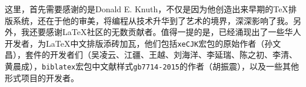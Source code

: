 \begin{WUTacknowledgements}
\par 这里，首先需要感谢的是Donald E. Knuth，不仅是因为他创造出来早期的{\TeX}排版系统，还在于他的审美，将编程从技术升华到了艺术的境界，深深影响了我。另外，我还要感谢{\LaTeX}社区的无数贡献者。值得一提的是，已经涌现出了一些华人开发者，为{\LaTeX}中文排版添砖加瓦，他们包括\texttt{xeCJK}宏包的原始作者（孙文昌），{\CTeX}套件的开发者们（吴凌云、江疆、王越、刘海洋、李延瑞、陈之初、李清、黄晨成），\texttt{biblatex}宏包中文献样式\texttt{gb7714-2015}的作者（胡振震），以及一些其他形式项目的开发者。
\end{WUTacknowledgements}
